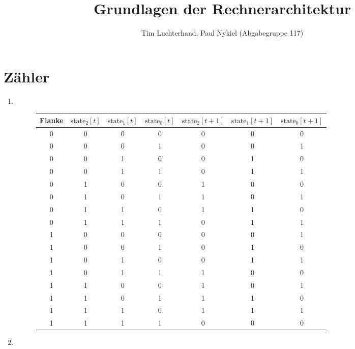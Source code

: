 \documentclass[DIN, pagenumber=false, fontsize=11pt, parskip=half]{scrartcl}
\title{Grundlagen der Rechnerarchitektur}
\author{Tim Luchterhand, Paul Nykiel (Abgabegruppe 117)}
\begin{document}
    \maketitle
    \section{Zähler}
    \begin{enumerate}[label=(\alph*)]
        \item $ $
            \begin{figure}[H]
                \centering
                \begin{tabular}{c|ccc|ccc}
                    \toprule
                    Flanke & $\text{state}_2[t]$ & $\text{state}_1[t]$ & $\text{state}_0[t]$ & $\text{state}_2[t+1]$ & $\text{state}_1[t+1]$ & $\text{state}_0[t+1]$ \\
                    \midrule
                    0 & 0 & 0 & 0 & 0 & 0 & 0\\
                    0 & 0 & 0 & 1 & 0 & 0 & 1\\
                    0 & 0 & 1 & 0 & 0 & 1 & 0\\
                    0 & 0 & 1 & 1 & 0 & 1 & 1\\
                    0 & 1 & 0 & 0 & 1 & 0 & 0\\
                    0 & 1 & 0 & 1 & 1 & 0 & 1\\
                    0 & 1 & 1 & 0 & 1 & 1 & 0\\
                    0 & 1 & 1 & 1 & 0 & 1 & 1\\
                    1 & 0 & 0 & 0 & 0 & 0 & 1\\
                    1 & 0 & 0 & 1 & 0 & 1 & 0\\
                    1 & 0 & 1 & 0 & 0 & 1 & 1\\
                    1 & 0 & 1 & 1 & 1 & 0 & 0\\
                    1 & 1 & 0 & 0 & 1 & 0 & 1\\
                    1 & 1 & 0 & 1 & 1 & 1 & 0\\
                    1 & 1 & 1 & 0 & 1 & 1 & 1\\
                    1 & 1 & 1 & 1 & 0 & 0 & 0\\
                    \bottomrule
                \end{tabular}
            \end{figure}
        \item
            \begin{eqnarray*}

\end{eqnarray*}
\end{enumerate}
\end{document}
